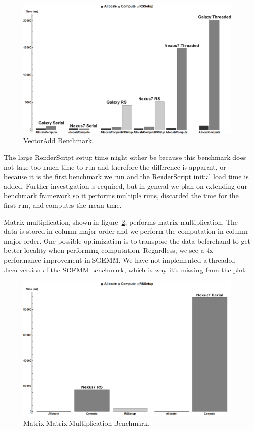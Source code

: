 \begin{figure}[t!]
\includegraphics[scale=0.125]{VectorAdd_nolog.png}
\caption{VectorAdd Benchmark.}
\label{fig:vecadd}
\centering
\end{figure}

The large RenderScript setup time might either be because this benchmark does not take too much time
  to run and therefore the difference is apparent, or because it is the first benchmark we run and
  the RenderScript initial load time is added.
Further investigation is required, but in general we plan on extending our benchmark framework so 
  it performs multiple runs, discarded the time for the first run, and computes the mean time.



Matrix multiplication, shown in figure~\ref{fig:sgemm}, performs matrix multiplication.
The data is stored in column major order and we perform the computation in column major order.
One possible optimization is to transpose the data beforehand to get better locality when performing computation.
Regardless, we see a 4x performance improvement in SGEMM.
We have not implemented a threaded Java version of the SGEMM benchmark, which is why it's missing from
  the plot.
\begin{figure}[t!]
\includegraphics[scale=0.125]{Sgemm_nolog.png}
\caption{Matrix Matrix Multiplication Benchmark.}
\label{fig:sgemm}
\centering
\end{figure}


